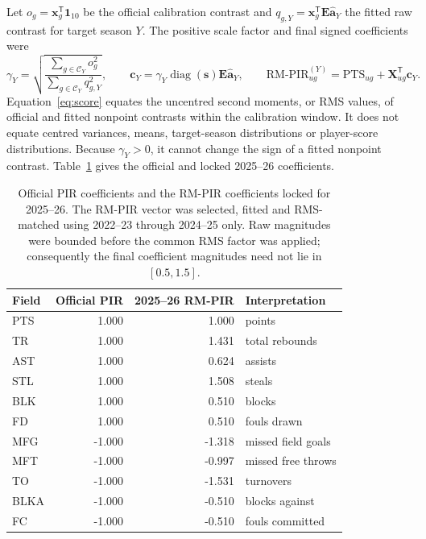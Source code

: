 \documentclass[pdflatex,sn-mathphys-num]{sn-jnl}
\newcommand{\rmpir}{\mathrm{RM\text{-}PIR}}
\begin{document}
Let \(o_g=\mathbf x_g^{\mathsf T}\mathbf1_{10}\) be the official calibration contrast and \(q_{g,Y}=\mathbf x_g^{\mathsf T}\mathbf E\widehat{\mathbf a}_Y\) the fitted raw contrast for target season \(Y\). The positive scale factor and final signed coefficients were
\begin{equation}
\gamma_Y=
\sqrt{\frac{\sum_{g\in\mathcal C_Y}o_g^2}
{\sum_{g\in\mathcal C_Y}q_{g,Y}^2}},
\qquad
\mathbf c_Y=\gamma_Y\operatorname{diag}(\mathbf s)\mathbf E\widehat{\mathbf a}_Y,
\qquad
\rmpir_{ug}^{(Y)}=\mathrm{PTS}_{ug}+\mathbf X_{ug}^{\mathsf T}\mathbf c_Y.
\label{eq:score}
\end{equation}
Equation~\ref{eq:score} equates the uncentred second moments, or RMS values, of official and fitted nonpoint contrasts within the calibration window. It does not equate centred variances, means, target-season distributions or player-score distributions. Because \(\gamma_Y>0\), it cannot change the sign of a fitted nonpoint contrast. Table~\ref{tab:coefficients} gives the official and locked 2025--26 coefficients.

\begin{table}[t]
\caption{Official PIR coefficients and the RM-PIR coefficients locked for 2025--26. The RM-PIR vector was selected, fitted and RMS-matched using 2022--23 through 2024--25 only. Raw magnitudes were bounded before the common RMS factor was applied; consequently the final coefficient magnitudes need not lie in \([0.5,1.5]\).}
\label{tab:coefficients}
\centering
\small
\begin{tabular}{@{}lrrl@{}}
\toprule
Field & Official PIR & 2025--26 RM-PIR & Interpretation \\
\midrule
PTS  &  1.000 &  1.000 & points \\
TR   &  1.000 &  1.431 & total rebounds \\
AST  &  1.000 &  0.624 & assists \\
STL  &  1.000 &  1.508 & steals \\
BLK  &  1.000 &  0.510 & blocks \\
FD   &  1.000 &  0.510 & fouls drawn \\
MFG  & -1.000 & -1.318 & missed field goals \\
MFT  & -1.000 & -0.997 & missed free throws \\
TO   & -1.000 & -1.531 & turnovers \\
BLKA & -1.000 & -0.510 & blocks against \\
FC   & -1.000 & -0.510 & fouls committed \\
\bottomrule
\end{tabular}
\end{table}
\end{document}
